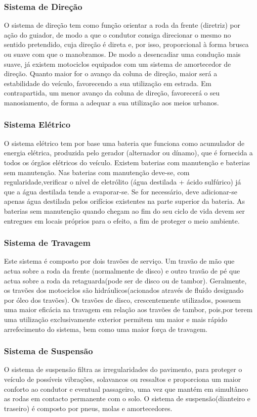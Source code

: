 \documentclass{report}
\begin{document}
\subsubsection{Sistema de Direção}
O sistema de direção tem como função orientar a roda da frente (diretriz) por ação do guiador, de modo a que o condutor consiga direcionar o mesmo no sentido pretendido, cuja direção é direta e, por isso, proporcional à forma brusca ou suave com que o manobramos. De modo a desencadiar uma condução mais suave, já existem motociclos equipados com um sistema de amortecedor de direção.
Quanto maior for o avanço da coluna de direção, maior será a estabilidade do veículo, favorecendo a sua utilização em estrada. Em contrapartida, um menor avanço da coluna de direção, favorecerá o seu manosiamento, de forma a adequar a sua utilização aos meios urbanos.
\subsubsection{Sistema Elétrico}
O sistema elétrico tem por base uma bateria que funciona como acumulador de energia elétrica, produzida pelo gerador (alternador ou dínamo), que é fornecida a todos os órgãos elétricos do veículo.
Existem baterias com manutenção e baterias sem manutenção. Nas baterias com manutenção deve-se, com regularidade,verificar o nível de  eletrólito (água destilada + ácido sulfúrico) já que a água destilada tende a evaporar-se. Se for necessário, deve adicionar-se apenas água destilada pelos orifícios existentes na parte superior da bateria. As baterias sem manutenção quando chegam ao fim do seu ciclo de vida devem ser entregues em locais próprios para o efeito, a fim de proteger o meio ambiente.
\subsubsection{Sistema de Travagem}
Este sistema é composto por dois travões de serviço. Um travão de mão que actua sobre a roda da frente (normalmente de disco) e outro travão de pé que actua sobre a roda da retaguarda(pode ser de disco ou de tambor).
Geralmente, os travões dos motociclos são hidráulicos(acionados através de fluído designado por óleo dos travões).
Os travões de disco, crescentemente utilizados, possuem uma maior eficácia na travagem em relação aos travões de tambor, pois,por terem uma utilização exclusivamente exterior permitem um maior e mais rápido arrefecimento do sistema, bem como uma maior força de travagem.
\subsubsection{Sistema de Suspensão}
O sistema de suspensão filtra as irregularidades do pavimento, para proteger o veículo de possíveis vibrações, solavancos ou ressaltos e proporciona um maior conforto ao condutor e eventual passageiro, uma vez que mantém em simultâneo as rodas em contacto permanente com o solo.
O sistema de suspensão(dianteiro e traseiro) é composto por pneus, molas e amortecedores.
\end{document}
